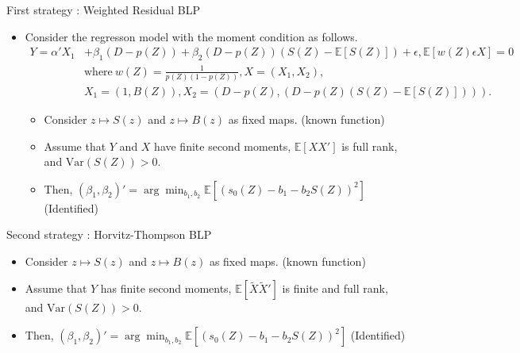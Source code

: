 \documentclass[xcolor=svgnames,aspectratio=169]{beamer}
\newcommand{\E}{\mathbb{E}}
\newcommand{\var}{\text{Var}}
\begin{document}
\begin{frame}{First strategy : Weighted Residual BLP}
    \begin{itemize}
        \item Consider the regresson model with the moment condition as follows.
        \begin{align*}
            Y=\alpha'X_1&+\beta_1(D-p(Z))+\beta_2(D-p(Z))(S(Z)-\E[S(Z)])+\epsilon, \E[w(Z)\epsilon X]=0 \\
            &\text{where} \  w(Z)=\frac{1}{p(Z)(1-p(Z))}, X=(X_1,X_2), \\ 
            &X_1=(1,B(Z)),X_2=(D-p(Z),(D-p(Z)(S(Z)-\E[S(Z)]))).
        \end{align*}
        \begin{tcolorbox}[colframe=Cyan,title=Theorem 1]
        \begin{itemize}
            \item Consider $z\mapsto S(z)$ and $z\mapsto B(z)$ as fixed maps. (known function)
            \item Assume that $Y$ and $X$ have finite second moments, $\E[XX']$ is full rank, and $\var(S(Z))>0$.
            \item Then, $(\beta_1, \beta_2)'=\arg\min_{b_1,b_2}\E[(s_0(Z)-b_1-b_2 S(Z))^2]$ (Identified)
        \end{itemize}
    \end{tcolorbox}
    \end{itemize}
\end{frame}

\begin{frame}{Second strategy : Horvitz-Thompson BLP}
    \begin{itemize}
        \begin{tcolorbox}[colframe=Cyan,title=Theorem 2]
        \begin{itemize}
            \item Consider $z\mapsto S(z)$ and $z\mapsto B(z)$ as fixed maps. (known function)
            \item Assume that $Y$ has finite second moments, $\E[\tilde{X}\tilde{X}']$ is finite and full rank, and $\var(S(Z))>0$.
            \item Then, $(\beta_1, \beta_2)'=\arg\min_{b_1,b_2}\E[(s_0(Z)-b_1-b_2 S(Z))^2]$ (Identified)
        \end{itemize}
    \end{tcolorbox}
    \end{itemize}
\end{frame}
\end{document}

